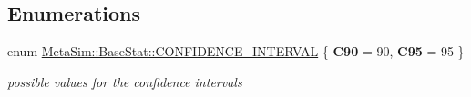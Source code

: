 \subsection*{Enumerations}
\begin{DoxyCompactItemize}
\item 
enum \hyperlink{group__metasim__stat_ga4d14ae31bff47d98dc795b118c8b2ccd}{Meta\+Sim\+::\+Base\+Stat\+::\+C\+O\+N\+F\+I\+D\+E\+N\+C\+E\+\_\+\+I\+N\+T\+E\+R\+V\+AL} \{ {\bfseries C90} = 90, 
{\bfseries C95} = 95
 \}\hypertarget{group__metasim__stat_ga4d14ae31bff47d98dc795b118c8b2ccd}{}\label{group__metasim__stat_ga4d14ae31bff47d98dc795b118c8b2ccd}
\begin{DoxyCompactList}\small\item\em possible values for the confidence intervals \end{DoxyCompactList}
\end{DoxyCompactItemize}
